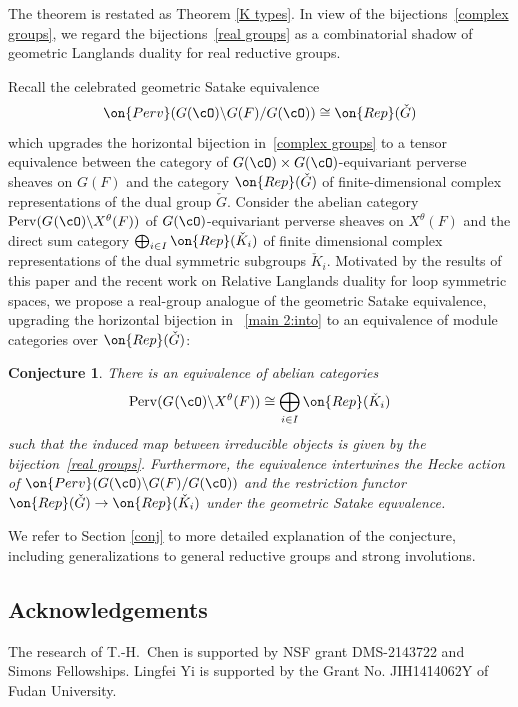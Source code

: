 \documentclass[12pt]{amsart}
\newtheorem{conj}[thm]{Conjecture}
\theoremstyle{remark}
\begin{document}
The theorem is restated as Theorem \ref{K types}. In view of the bijections~\eqref{complex groups}, we regard the bijections~\eqref{real groups} as a combinatorial shadow of geometric Langlands duality for real reductive groups.



Recall the celebrated geometric Satake equivalence 
\[\on{Perv}(G(\cO)\backslash G(F)/G(\cO))\cong\on{Rep}(\check G)\]
which upgrades the horizontal bijection in~\eqref{complex groups} to a tensor equivalence between the category of $G(\cO)\times G(\cO)$-equivariant perverse sheaves on $G(F)$ and the category $\on{Rep}(\check G)$ of finite-dimensional complex representations of the dual group $\check G$.
Consider 
 the abelian category
$\mathrm{Perv}(G^{}(\cO)\backslash X
^\theta(F))$
of $G(\cO)$-equivariant perverse sheaves on $X^\theta(F)$ and the direct sum category 
$\bigoplus_{i\in I}\on{Rep}(\check K_i)$ of finite dimensional complex representations of the dual symmetric subgroups $\check K_i$.
Motivated by the results of this paper and the recent work \cite{C} on Relative Langlands duality for loop symmetric spaces, we propose a real-group analogue of the geometric Satake equivalence, upgrading the horizontal bijection in ~\eqref{main 2:into} to an equivalence of module categories over $\on{Rep}(\check G)$:

\begin{conj}
There is an equivalence of abelian categories
\[\mathrm{Perv}(G^{}(\cO)\backslash X
^\theta(F))\cong\bigoplus_{i\in I}\on{Rep}(\check K_i)\]
such that the induced map between irreducible objects is given by the bijection~\eqref{real groups}.
Furthermore, the equivalence intertwines the Hecke action of 
$\on{Perv}(G(\cO)\backslash G(F)/G(\cO))$ and the restriction functor $\on{Rep}(\check G)\to\on{Rep}(\check K_i)$ under the geometric Satake equvalence.
\end{conj}

We refer to 
Section \ref{conj} to more 
detailed explanation of the conjecture, including generalizations 
to general reductive groups and strong involutions.



\subsection*{Acknowledgements} 
The research of
T.-H.~Chen is supported by NSF grant DMS-2143722 and Simons Fellowships.
Lingfei Yi is supported by the Grant No. JIH1414062Y of Fudan University. 
\end{document}
